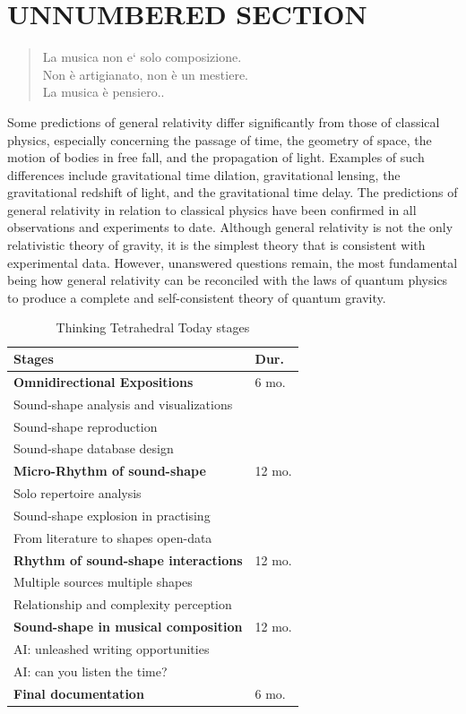 \documentclass[
	a4paper,
	twocolumn
	]{article}
\begin{document}
\section*{UNNUMBERED SECTION}

\begin{quote}
La musica non e` solo composizione. \\
Non è artigianato, non è un mestiere. \\
La musica è pensiero.\cite{nono85}.
\end{quote}

Some predictions of general relativity differ significantly from those of
classical physics, especially concerning the passage of time, the geometry of
space, the motion of bodies in free fall, and the propagation of light. Examples
of such differences include gravitational time dilation, gravitational lensing,
the gravitational redshift of light, and the gravitational time delay. The
predictions of general relativity in relation to classical physics have been
confirmed in all observations and experiments to date. Although general
relativity is not the only relativistic theory of gravity, it is the simplest
theory that is consistent with experimental data. However, unanswered questions
remain, the most fundamental being how general relativity can be reconciled with
the laws of quantum physics to produce a complete and self-consistent theory of
quantum gravity.

\begin{table}[htp]
\begin{center}
\begin{tabular}{ll}
\textbf{Stages} & \textbf{Dur.} \\
\hline
\textbf{Omnidirectional Expositions} & 6 mo. \\
Sound-shape analysis and visualizations & \\
Sound-shape reproduction & \\
Sound-shape database design & \\
\hline
\textbf{Micro-Rhythm of sound-shape} & 12 mo. \\
Solo repertoire analysis & \\
Sound-shape explosion in practising & \\
From literature to shapes open-data & \\
\hline
\textbf{Rhythm of sound-shape interactions} & 12 mo. \\
Multiple sources multiple shapes & \\
Relationship and complexity perception & \\
\hline
\textbf{Sound-shape in musical composition} & 12 mo. \\
AI: unleashed writing opportunities & \\
AI: can you listen the time? & \\
\hline
\textbf{Final documentation} & 6 mo. \\
\end{tabular}
\label{timesheet}
\caption{Thinking Tetrahedral Today stages}
\end{center}
\end{table}%
\end{document}
